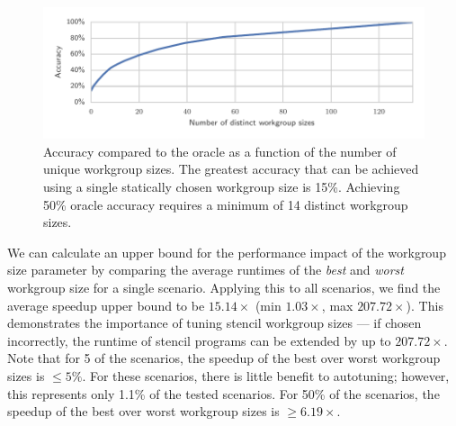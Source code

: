 \documentclass[nonatbib,preprint,9pt]{sigplanconf}
\begin{document}
\begin{figure}
\centering
\includegraphics[width=\columnwidth]{img/num_params_oracle.pdf}
\caption{%
  Accuracy compared to the oracle as a function of the number of
  unique workgroup sizes. The greatest accuracy that can be achieved
  using a single statically chosen workgroup size is 15\%. Achieving
  50\% oracle accuracy requires a minimum of 14 distinct workgroup
  sizes.%
}
\label{fig:oracle-accuracy}
\end{figure}


We can calculate an upper bound for the performance impact of the
workgroup size parameter by comparing the average runtimes of the
\emph{best} and \emph{worst} workgroup size for a single
scenario. Applying this to all scenarios, we find the average speedup
upper bound to be $15.14\times$ (min $1.03\times$, max
$207.72\times$). This demonstrates the importance of tuning stencil
workgroup sizes --- if chosen incorrectly, the runtime of stencil
programs can be extended by up to $207.72\times$. Note that for 5 of
the scenarios, the speedup of the best over worst workgroup sizes is
$\le 5\%$. For these scenarios, there is little benefit to autotuning;
however, this represents only 1.1\% of the tested scenarios. For 50\%
of the scenarios, the speedup of the best over worst workgroup sizes
is $\ge 6.19\times$.
\end{document}
